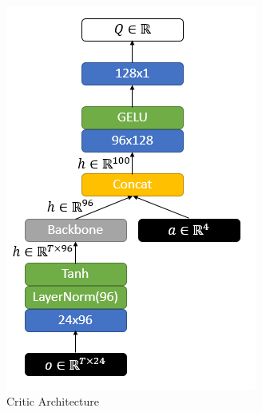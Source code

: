 \begin{figure}
	\begin{subfigure}{.5\textwidth}
		\centering
		\includegraphics[width=0.97\linewidth]{figures/nets/critic.png}
		\caption{Critic Architecture}
		\label{fig:critic_net}
	\end{subfigure}
	\begin{subfigure}{.5\textwidth}
		\centering

\end{subfigure}
\end{figure}
